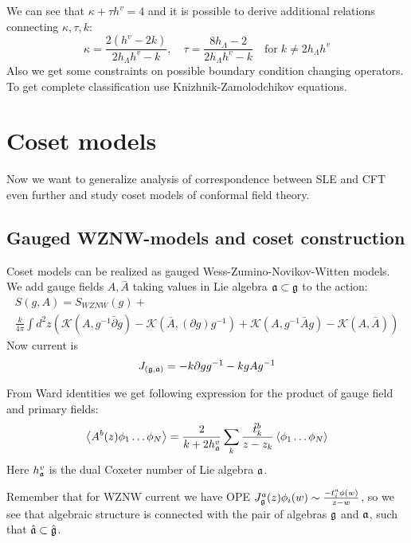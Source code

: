 We can see that $\kappa+\tau h^{v}=4$ and it is possible to derive additional relations connecting $\kappa, \tau, k$:
\begin{equation*}
  \kappa=\frac{2(h^{v}-2k)}{2h_{\Lambda}h^{v}-k},\quad \tau=\frac{8 h_{\Lambda}-2}{2h_{\Lambda}h^{v}-k}  \quad\text{for}\; k\neq 2h_{\Lambda}h^{v}
\end{equation*}
 Also we get some constraints on possible boundary condition changing operators. 
To get complete classification use Knizhnik-Zamolodchikov equations.


\section{Coset models}
\label{sec:coset-models}
Now we want to generalize analysis of correspondence between SLE and CFT even further and study coset models of conformal field theory.


\subsection{Gauged WZNW-models and coset construction}

Coset models can be realized as gauged Wess-Zumino-Novikov-Witten models. We add gauge fields  $A, \bar{A}$ taking values in Lie algebra $\mathfrak{a}\subset \mathfrak{g}$ to the action:
\begin{multline*}
  S(g,A)=S_{WZNW}(g)+\\
  \frac{k}{4\pi}\int d^{2}z \left(\mathcal{K}(A, g^{-1}\bar \partial g)-\mathcal{K}(\bar A, (\partial g ) g^{-1})+\mathcal{K}(A,g^{-1}\bar A g)-\mathcal{K}(A,\bar A)\right)
\end{multline*}
Now current is
\begin{equation*}
  J_{(\mathfrak{g},\mathfrak{a})}=-k\partial g g^{-1} -k g A g^{-1}
\end{equation*}

From Ward identities we get following expression for the product of gauge field and primary fields:
\begin{equation*}
  \left< A^{b}(z)\phi_{1}\dots \phi_{N}\right>=\frac{2}{k+2 h^{v}_{\mathfrak{a}}}\sum_{k}\frac{\tilde{t}^{b}_{k}}{z-z_{k}}\left<\phi_{1}\dots \phi_{N}\right>
\end{equation*}
Here $h_{\mathfrak{a}}^{v}$ is the dual Coxeter number of Lie algebra $\mathfrak{a}$.

Remember that for WZNW current we have OPE $J_{\mathfrak{g}}^{a}(z)\phi_{i}(w)\sim \frac{-t^{a}_{i}\phi(w)}{z-w}$,  so we see that algebraic structure is connected with the pair of algebras $\mathfrak{g}$ and $\mathfrak{a}$, such that $\hat{\mathfrak{a}}\subset\hat{\mathfrak{g}}$. 

